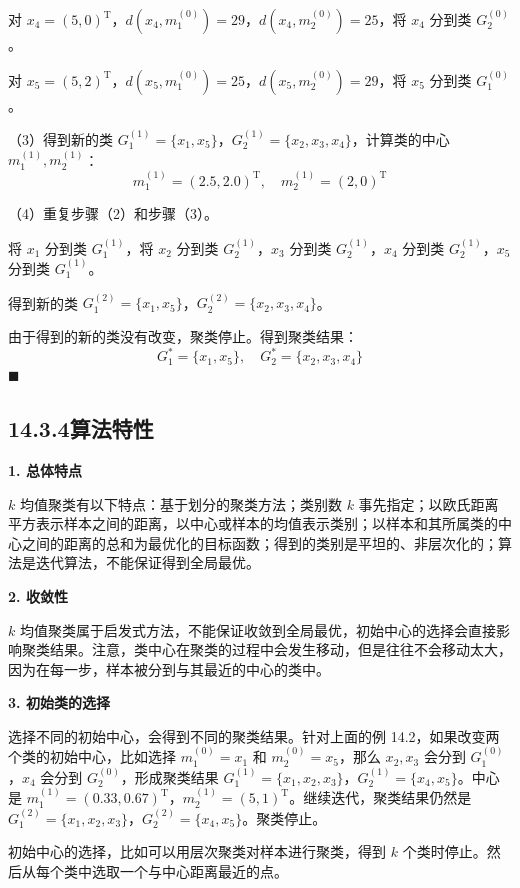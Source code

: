 \documentclass[UTF8,12pt,a4paper,fontset=fandol]{ctexart}
\begin{document}
对 $x_4=(5,0)^{\mathrm{T}}$，$d(x_4,m_1^{(0)})=29$，$d(x_4,m_2^{(0)})=25$，将 $x_4$ 分到类 $G_2^{(0)}$。

对 $x_5=(5,2)^{\mathrm{T}}$，$d(x_5,m_1^{(0)})=25$，$d(x_5,m_2^{(0)})=29$，将 $x_5$ 分到类 $G_1^{(0)}$。

（3）得到新的类 $G_1^{(1)}=\{x_1,x_5\}$，$G_2^{(1)}=\{x_2,x_3,x_4\}$，计算类的中心 $m_1^{(1)},m_2^{(1)}$：
\[
m_1^{(1)}=(2.5,2.0)^{\mathrm{T}},\quad m_2^{(1)}=(2,0)^{\mathrm{T}}
\]

（4）重复步骤（2）和步骤（3）。

将 $x_1$ 分到类 $G_1^{(1)}$，将 $x_2$ 分到类 $G_2^{(1)}$，$x_3$ 分到类 $G_2^{(1)}$，$x_4$ 分到类 $G_2^{(1)}$，$x_5$ 分到类 $G_1^{(1)}$。

得到新的类 $G_1^{(2)}=\{x_1,x_5\}$，$G_2^{(2)}=\{x_2,x_3,x_4\}$。

由于得到的新的类没有改变，聚类停止。得到聚类结果：
\[
G_1^*=\{x_1,x_5\},\quad G_2^*=\{x_2,x_3,x_4\}
\]
\hfill$\blacksquare$

\subsection*{14.3.4\quad 算法特性}

\noindent\textbf{1. 总体特点}

$k$ 均值聚类有以下特点：基于划分的聚类方法；类别数 $k$ 事先指定；以欧氏距离平方表示样本之间的距离，以中心或样本的均值表示类别；以样本和其所属类的中心之间的距离的总和为最优化的目标函数；得到的类别是平坦的、非层次化的；算法是迭代算法，不能保证得到全局最优。

\noindent\textbf{2. 收敛性}

$k$ 均值聚类属于启发式方法，不能保证收敛到全局最优，初始中心的选择会直接影响聚类结果。注意，类中心在聚类的过程中会发生移动，但是往往不会移动太大，因为在每一步，样本被分到与其最近的中心的类中。

\noindent\textbf{3. 初始类的选择}

选择不同的初始中心，会得到不同的聚类结果。针对上面的例 14.2，如果改变两个类的初始中心，比如选择 $m_1^{(0)}=x_1$ 和 $m_2^{(0)}=x_5$，那么 $x_2,x_3$ 会分到 $G_1^{(0)}$，$x_4$ 会分到 $G_2^{(0)}$，形成聚类结果 $G_1^{(1)}=\{x_1,x_2,x_3\}$，$G_2^{(1)}=\{x_4,x_5\}$。中心是 $m_1^{(1)}=(0.33,0.67)^{\mathrm{T}}$，$m_2^{(1)}=(5,1)^{\mathrm{T}}$。继续迭代，聚类结果仍然是 $G_1^{(2)}=\{x_1,x_2,x_3\}$，$G_2^{(2)}=\{x_4,x_5\}$。聚类停止。

初始中心的选择，比如可以用层次聚类对样本进行聚类，得到 $k$ 个类时停止。然后从每个类中选取一个与中心距离最近的点。
\end{document}
